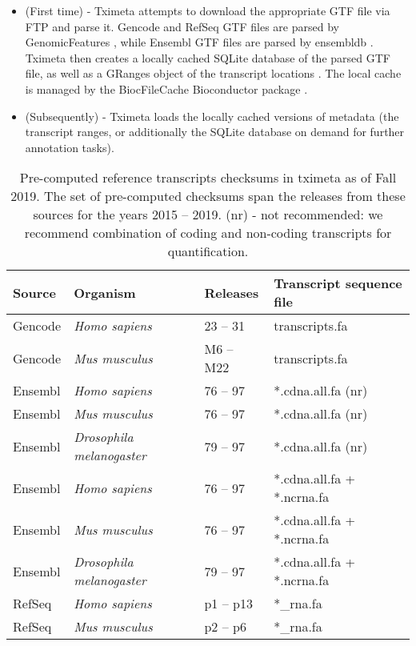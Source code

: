 \documentclass[12pt]{article}
\begin{document}
\begin{itemize}
\item (First time) - Tximeta attempts to download the appropriate GTF file via FTP and parse it. Gencode and RefSeq GTF files are parsed by GenomicFeatures \citep{granges}, while Ensembl GTF files are parsed by ensembldb \citep{ensembldb}. Tximeta then creates a locally cached SQLite database of the parsed GTF file, as well as a GRanges object of the transcript locations \citep{granges}. The local cache is managed by the BiocFileCache Bioconductor package \citep{biocfilecache}.
\item (Subsequently) - Tximeta loads the locally cached versions of metadata (the transcript ranges, or additionally the SQLite database on demand for further annotation tasks).
\end{itemize}

\begin{table}[t]
\centering
\begin{tabular}{llll} 
\hline
Source & Organism & Releases & Transcript sequence file \\
\hline\hline
Gencode & \textit{Homo sapiens} & 23 -- 31 &  transcripts.fa \\
Gencode & \textit{Mus musculus} & M6 -- M22 &  transcripts.fa \\
\hline
Ensembl & \textit{Homo sapiens} & 76 -- 97 &  *.cdna.all.fa (nr) \\
Ensembl & \textit{Mus musculus} & 76 -- 97 &  *.cdna.all.fa (nr) \\
Ensembl & \textit{Drosophila melanogaster} & 79 -- 97 &  *.cdna.all.fa (nr) \\
\hline
Ensembl & \textit{Homo sapiens} & 76 -- 97 &  *.cdna.all.fa + *.ncrna.fa \\
Ensembl & \textit{Mus musculus} & 76 -- 97 &  *.cdna.all.fa + *.ncrna.fa \\
Ensembl & \textit{Drosophila melanogaster} & 79 -- 97 &  *.cdna.all.fa + *.ncrna.fa \\
\hline
RefSeq & \textit{Homo sapiens} & p1 -- p13 &  *\_rna.fa \\
RefSeq & \textit{Mus musculus} & p2 -- p6 &  *\_rna.fa \\
\hline
\end{tabular}
\caption{Pre-computed reference transcripts checksums in tximeta as of Fall 2019. The set of pre-computed checksums span the releases from these sources for the years 2015 -- 2019. (nr) - not recommended: we recommend combination of coding and non-coding transcripts for quantification.}
\label{tab1}
\end{table}
\end{document}
